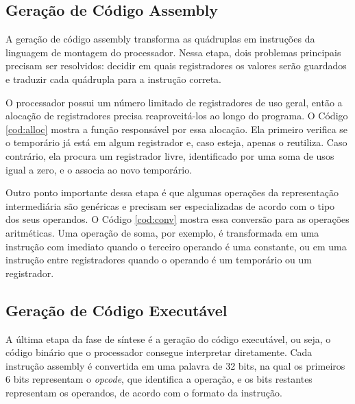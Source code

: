 \documentclass[
	12pt,				%
	oneside,
	a4paper,			%
	english,			%
	french,				%
	spanish,			%
	brazil,				%
	]{abntex2}
\begin{document}


\subsection{Geração de Código Assembly}
A geração de código assembly transforma as quádruplas em instruções da linguagem de montagem do processador. Nessa etapa, dois problemas principais precisam ser resolvidos: decidir em quais registradores os valores serão guardados e traduzir cada quádrupla para a instrução correta.

O processador possui um número limitado de registradores de uso geral, então a alocação de registradores precisa reaproveitá-los ao longo do programa. O Código \ref{cod:alloc} mostra a função responsável por essa alocação. Ela primeiro verifica se o temporário já está em algum registrador e, caso esteja, apenas o reutiliza. Caso contrário, ela procura um registrador livre, identificado por uma soma de usos igual a zero, e o associa ao novo temporário.



Outro ponto importante dessa etapa é que algumas operações da representação intermediária são genéricas e precisam ser especializadas de acordo com o tipo dos seus operandos. O Código \ref{cod:conv} mostra essa conversão para as operações aritméticas. Uma operação de soma, por exemplo, é transformada em uma instrução com imediato quando o terceiro operando é uma constante, ou em uma instrução entre registradores quando o operando é um temporário ou um registrador.



\subsection{Geração de Código Executável}
A última etapa da fase de síntese é a geração do código executável, ou seja, o código binário que o processador consegue interpretar diretamente. Cada instrução assembly é convertida em uma palavra de 32 bits, na qual os primeiros 6 bits representam o \textit{opcode}, que identifica a operação, e os bits restantes representam os operandos, de acordo com o formato da instrução.
\end{document}
